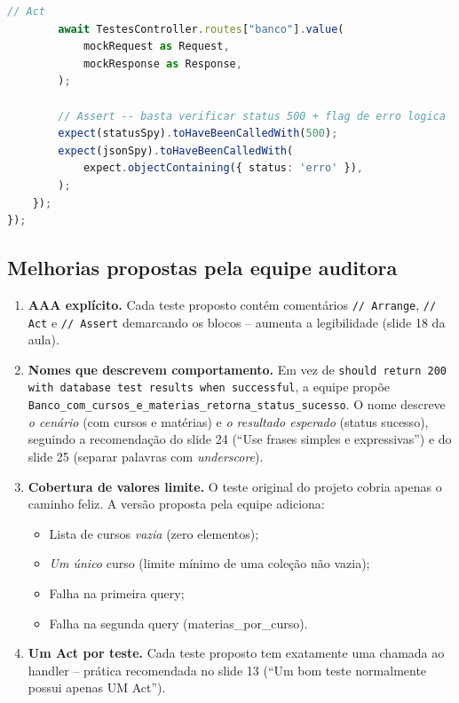 \documentclass[12pt,a4paper]{article}
\begin{document}
\begin{lstlisting}[language=TypeScript,caption={Versão reescrita aplicando AAA, melhor nomenclatura e cobertura de valores limite}]
        // Act
        await TestesController.routes["banco"].value(
            mockRequest as Request,
            mockResponse as Response,
        );

        // Assert -- basta verificar status 500 + flag de erro logica
        expect(statusSpy).toHaveBeenCalledWith(500);
        expect(jsonSpy).toHaveBeenCalledWith(
            expect.objectContaining({ status: 'erro' }),
        );
    });
});
\end{lstlisting}

\subsection{Melhorias propostas pela equipe auditora}

\begin{enumerate}[leftmargin=1.5em]

\item \textbf{AAA explícito.} Cada teste proposto contém comentários
\texttt{// Arrange}, \texttt{// Act} e \texttt{// Assert} demarcando os
blocos -- aumenta a legibilidade (slide 18 da aula).

\item \textbf{Nomes que descrevem comportamento.} Em vez de
\texttt{should return 200 with database test results when successful},
a equipe propõe
\texttt{Banco\_com\_cursos\_e\_materias\_retorna\_status\_sucesso}.
O nome descreve \emph{o cenário} (com cursos e matérias) e
\emph{o resultado esperado} (status sucesso), seguindo a recomendação
do slide 24 (``Use frases simples e expressivas'') e do slide 25
(separar palavras com \emph{underscore}).

\item \textbf{Cobertura de valores limite.} O teste original do
projeto cobria apenas o caminho feliz. A versão proposta pela equipe
adiciona:
\begin{itemize}[leftmargin=1.5em]
    \item Lista de cursos \emph{vazia} (zero elementos);
    \item \emph{Um único} curso (limite mínimo de uma coleção não vazia);
    \item Falha na primeira query;
    \item Falha na segunda query (materias\_por\_curso).
\end{itemize}

\item \textbf{Um Act por teste.} Cada teste proposto tem exatamente
uma chamada ao handler -- prática recomendada no slide 13 (``Um bom
teste normalmente possui apenas UM Act'').


\end{enumerate}
\end{document}
